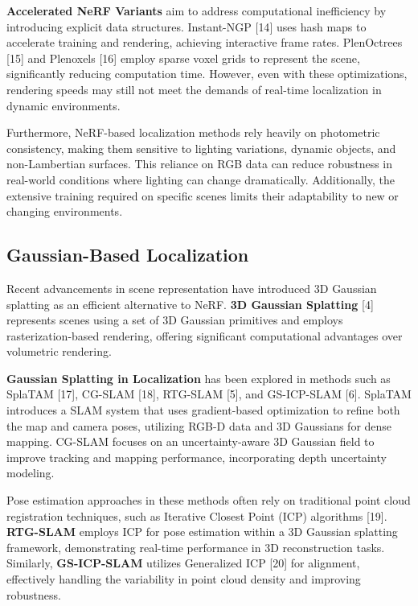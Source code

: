 \documentclass[twocolumn]{article} %
\begin{document}
\textbf{Accelerated NeRF Variants} aim to address computational
inefficiency by introducing explicit data structures. Instant-NGP
{[}14{]} uses hash maps to accelerate training and rendering, achieving
interactive frame rates. PlenOctrees {[}15{]} and Plenoxels {[}16{]}
employ sparse voxel grids to represent the scene, significantly reducing
computation time. However, even with these optimizations, rendering
speeds may still not meet the demands of real-time localization in
dynamic environments.

Furthermore, NeRF-based localization methods rely heavily on photometric
consistency, making them sensitive to lighting variations, dynamic
objects, and non-Lambertian surfaces. This reliance on RGB data can
reduce robustness in real-world conditions where lighting can change
dramatically. Additionally, the extensive training required on specific
scenes limits their adaptability to new or changing environments.

\subsection{Gaussian-Based
Localization}\label{gaussian-based-localization}

Recent advancements in scene representation have introduced 3D Gaussian
splatting as an efficient alternative to NeRF. \textbf{3D Gaussian
Splatting} {[}4{]} represents scenes using a set of 3D Gaussian
primitives and employs rasterization-based rendering, offering
significant computational advantages over volumetric rendering.

\textbf{Gaussian Splatting in Localization} has been explored in methods
such as SplaTAM {[}17{]}, CG-SLAM {[}18{]}, RTG-SLAM {[}5{]}, and
GS-ICP-SLAM {[}6{]}. SplaTAM introduces a SLAM system that uses
gradient-based optimization to refine both the map and camera poses,
utilizing RGB-D data and 3D Gaussians for dense mapping. CG-SLAM focuses
on an uncertainty-aware 3D Gaussian field to improve tracking and
mapping performance, incorporating depth uncertainty modeling.

Pose estimation approaches in these methods often rely on traditional
point cloud registration techniques, such as Iterative Closest Point
(ICP) algorithms {[}19{]}. \textbf{RTG-SLAM} employs ICP for pose
estimation within a 3D Gaussian splatting framework, demonstrating
real-time performance in 3D reconstruction tasks. Similarly,
\textbf{GS-ICP-SLAM} utilizes Generalized ICP {[}20{]} for alignment,
effectively handling the variability in point cloud density and
improving robustness.
\end{document}
